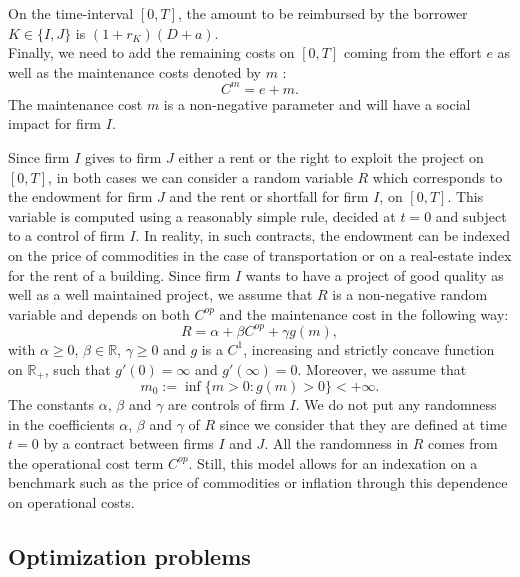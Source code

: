 \documentclass{svjour3}
\begin{document}
 On the time-interval $[0,T]$, the amount to be reimbursed  by the borrower $K\in\{I,J\}$ is $(1+r_K)(D+a)$.
  \\
Finally, we need to add the remaining costs on $[0,T]$ coming from the effort $e$ as well as the maintenance costs denoted by $m$ :
  \begin{equation}
  \label{EqOtherCost}
 C^m=e+m.
 \end{equation}
The maintenance cost $m$ is a non-negative parameter and will have a social impact for firm $I$. 

\vspace{5mm}

Since firm $I$ gives to firm $J$ either a rent or the right to exploit the project on $[0,T]$, in both cases we can consider a random variable $R$ which corresponds to the endowment for firm $J$ and the rent or shortfall for firm $I$, on $[0,T]$. This variable is computed using a reasonably simple rule, decided at  $t=0$ and subject to a control of firm $I$. In reality, in such contracts, the endowment can be indexed on the price of commodities in the case of transportation or on a real-estate index for the rent of a building. Since firm $I$ wants to have a project of good quality as well as a well maintained project, we assume that $R$ is a non-negative random variable and depends on both $C^{op}$ and the maintenance cost in the following way:
  \begin{equation}
  \label{EqEndowment}
 R=\alpha+\beta C^{op}+\gamma g(m),
 \end{equation}
with $\alpha\geq 0$, $\beta\in\mathbb{R}$, $\gamma\geq 0$ and $g$ is a $C^1$, increasing and strictly concave function on $\mathbb{R}_+$, such that $g'(0)=\infty$ and $g'(\infty)=0$. Moreover, we assume that
 \begin{equation}
 \label{hypginfty}
 m_0:=\inf\{m>0:g(m)>0\}<+\infty.
 \end{equation}
The constants $\alpha$, $\beta$ and $\gamma$ are controls of firm $I$.
We do not put any randomness in the coefficients $\alpha$, $\beta$ and $\gamma$ of $R$ since we consider that they are defined at time $t=0$ by a contract between firms $I$ and $J$. All the randomness in $R$ comes from the operational cost term $C^{op}$. Still, this model allows for an indexation on a benchmark such as the price of commodities or inflation through this dependence on operational costs.

\subsection{Optimization problems}
\end{document}
